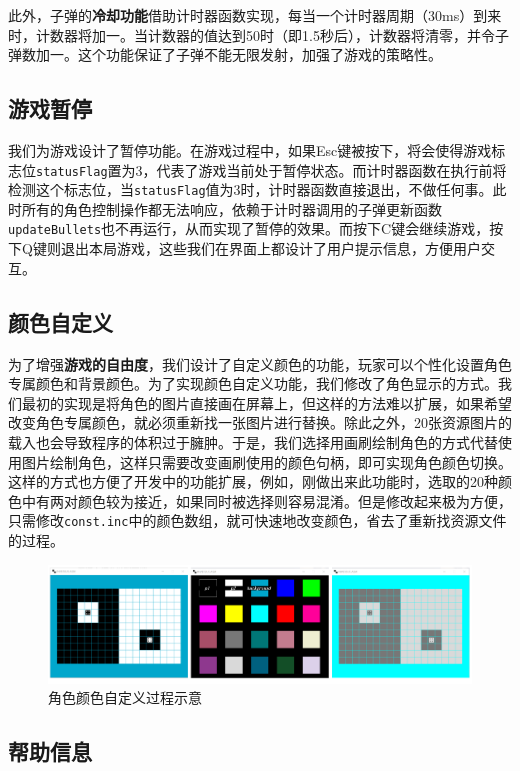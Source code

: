 \documentclass[lang=cn,11pt,a4paper]{elegantpaper}
\begin{document}
此外，子弹的\textbf{冷却功能}借助计时器函数实现，每当一个计时器周期（30ms）到来时，计数器将加一。当计数器的值达到50时（即1.5秒后），计数器将清零，并令子弹数加一。这个功能保证了子弹不能无限发射，加强了游戏的策略性。


\subsection{游戏暂停}

我们为游戏设计了暂停功能。在游戏过程中，如果Esc键被按下，将会使得游戏标志位\verb|statusFlag|置为3，代表了游戏当前处于暂停状态。而计时器函数在执行前将检测这个标志位，当\verb|statusFlag|值为3时，计时器函数直接退出，不做任何事。此时所有的角色控制操作都无法响应，依赖于计时器调用的子弹更新函数\verb|updateBullets|也不再运行，从而实现了暂停的效果。而按下C键会继续游戏，按下Q键则退出本局游戏，这些我们在界面上都设计了用户提示信息，方便用户交互。

\subsection{颜色自定义}

为了增强\textbf{游戏的自由度}，我们设计了自定义颜色的功能，玩家可以个性化设置角色专属颜色和背景颜色。为了实现颜色自定义功能，我们修改了角色显示的方式。我们最初的实现是将角色的图片直接画在屏幕上，但这样的方法难以扩展，如果希望改变角色专属颜色，就必须重新找一张图片进行替换。除此之外，20张资源图片的载入也会导致程序的体积过于臃肿。于是，我们选择用画刷绘制角色的方式代替使用图片绘制角色，这样只需要改变画刷使用的颜色句柄，即可实现角色颜色切换。这样的方式也方便了开发中的功能扩展，例如，刚做出来此功能时，选取的20种颜色中有两对颜色较为接近，如果同时被选择则容易混淆。但是修改起来极为方便，只需修改\verb|const.inc|中的颜色数组，就可快速地改变颜色，省去了重新找资源文件的过程。

\begin{figure}[htbp]
    \centering
    \includegraphics[width=0.95\linewidth]{img/color.png}
    \caption{角色颜色自定义过程示意}
    \label{F3}
\end{figure}

\subsection{帮助信息}
\end{document}
